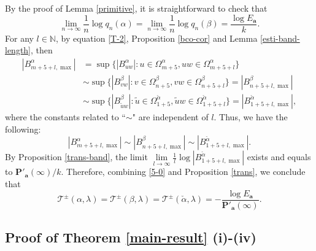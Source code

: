 \documentclass[reqno,11pt,graphicx,]{amsart}
\numberwithin{equation}{section}
\theoremstyle{plain}
\newcommand{\N}{{\mathbb N}}
\newcommand{\p}{\mathbf P}
\newcommand{\3}{\mathbf{3}}
\newcommand{\ma}{\mathbf{a}}
\begin{document}
	By the proof of Lemma \ref{primitive}, it is straightforward to check that
	\begin{equation}\label{5-0}
		\lim\limits_{n\to\infty}\frac{1}{n}\log q_n(\alpha)=\lim\limits_{n\to\infty}\frac{1}{n}\log q_n(\beta)=\frac{\log E_{\ma}}{k}.
	\end{equation}
	For any $l\in\N$, by equation \eqref{T-2}, Proposition \ref{bco-cor} and Lemma \ref{esti-band-length}, then
	\begin{align*}
		|B^{\alpha}_{m+5+l,\max}|&=\sup\{|B^{\alpha}_{uw}|:u\in\Omega^{\alpha}_{m+5},uw\in\Omega^{\alpha}_{m+5+l}\}\\
		&\sim\sup\{|B^{\beta}_{vw}|:v\in\Omega^{\beta}_{n+5},vw\in\Omega^{\beta}_{n+5+l}\}=|B^{\beta}_{n+5+l,\max}|\\
		&\sim\sup\{|B^{\beta}_{\tilde{u}w}|:\tilde{u}\in\Omega^{\check{\alpha}}_{1+5},\tilde{u}w\in\Omega^{\check{\alpha}}_{1+5+l}\}=|B^{\check{\alpha}}_{1+5+l,\max}|,
	\end{align*}
	where the constants related to ``$\sim$" are independent of $l$. Thus, we have the following:
	\begin{equation*}
		|B^{\alpha}_{m+5+l,\max}|\sim |B^{\beta}_{n+5+l,\max}|\sim |B^{\check{\alpha}}_{1+5+l,\max}|.
	\end{equation*}
	By Proposition \ref{trans-band}, the limit $\lim\limits_{l\to\infty}\frac{1}{l}\log|B^{\check{\alpha}}_{1+5+l,\max}|$ exists and equals to $\p'_{\ma}(\infty)/k$. Therefore, combining \eqref{5-0} and Proposition \ref{trans}, we conclude that 
	\begin{equation}\label{trans-1}
		\mathcal{T}^{\pm}(\alpha,\lambda)=\mathcal{T}^{\pm}(\beta,\lambda)=\mathcal{T}^{\pm}(\check{\alpha},\lambda)=-\frac{\log E_{\ma}}{\p'_{\ma}(\infty)}.
	\end{equation}
	\subsection{Proof of Theorem \ref{main-result} (i)-(iv)}\
	
\end{document}
